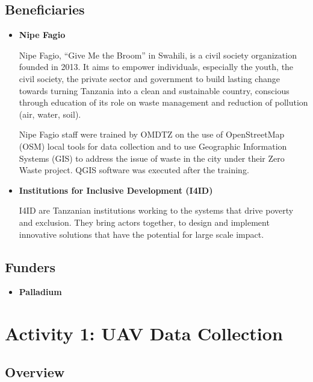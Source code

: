 \documentclass[a4paper,12pt,twoside]{article}
\begin{document}
\subsection{Beneficiaries}

    \begin{itemize}
        \item \textbf{Nipe Fagio}
    
        Nipe Fagio, “Give Me the Broom” in Swahili, is a civil society organization founded in 2013. It aims to empower individuals, especially the youth, the civil society, the private sector and government to build lasting change towards turning Tanzania into a clean and sustainable country, conscious through education of its role on waste management and reduction of pollution (air, water, soil).
    
        Nipe Fagio staff were trained by OMDTZ on the use of OpenStreetMap (OSM) local tools for data collection and to use Geographic Information Systems (GIS) to address the issue of waste in the city under their Zero Waste project. QGIS software was executed after the training.

        \item \textbf{Institutions for Inclusive Development (I4ID)}
    
        I4ID are Tanzanian institutions working to the systems that drive poverty and exclusion. They bring actors together, to design and implement innovative solutions that have the potential for large scale impact.
    
    \end{itemize}

\subsection{Funders}

    \begin{itemize}
        \item \textbf{Palladium}
    
        \lipsum[0-1]
    
    \end{itemize}   

\section{Activity 1: UAV Data Collection}

\subsection{Overview}
\end{document}
